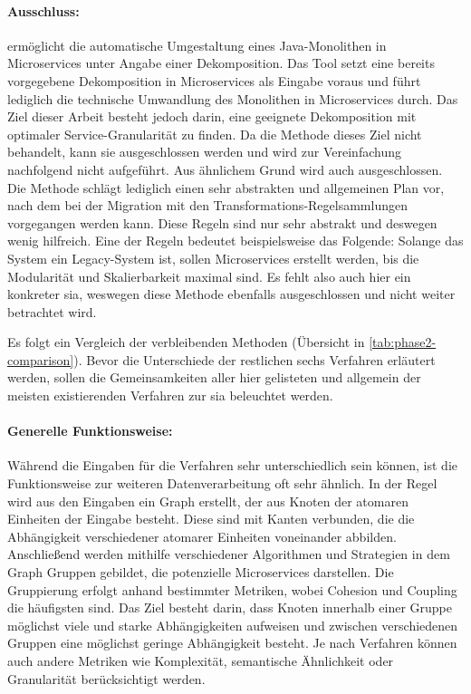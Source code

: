 \paragraph{Ausschluss:}  ermöglicht die automatische Umgestaltung eines Java-Mo\-no\-li\-then in Microservices unter Angabe einer Dekomposition.
Das Tool setzt eine bereits vorgegebene Dekomposition in Microservices als Eingabe voraus und führt lediglich die technische Umwandlung des Monolithen in Microservices durch.
Das Ziel dieser Arbeit besteht jedoch darin, eine geeignete Dekomposition mit optimaler Service-Granularität zu finden.
Da die Methode dieses Ziel nicht behandelt, kann sie ausgeschlossen werden und wird zur Vereinfachung nachfolgend nicht aufgeführt.
Aus ähnlichem Grund wird auch  ausgeschlossen.
Die Methode schlägt lediglich einen sehr abstrakten und allgemeinen Plan vor, nach dem bei der Migration mit den Transformations-Regelsammlungen vorgegangen werden kann.
Diese Regeln sind nur sehr abstrakt und deswegen wenig hilfreich.
Eine der Regeln bedeutet beispielsweise das Folgende:
Solange das System ein Legacy-System ist, sollen Microservices erstellt werden, bis die Modularität und Skalierbarkeit maximal sind.
Es fehlt also auch hier ein konkreter \gls{sia}, weswegen diese Methode ebenfalls ausgeschlossen und nicht weiter betrachtet wird.


Es folgt ein Vergleich der verbleibenden Methoden (Übersicht in \cref{tab:phase2-comparison}).
Bevor die Unterschiede der restlichen sechs Verfahren erläutert werden, sollen die Gemeinsamkeiten aller hier gelisteten und allgemein der meisten existierenden Verfahren zur \gls{sia} beleuchtet werden.



\paragraph{Generelle Funktionsweise:}
Während die Eingaben für die Verfahren sehr unterschiedlich sein können, ist die Funktionsweise zur weiteren Datenverarbeitung oft sehr ähnlich.
In der Regel wird aus den Eingaben ein Graph erstellt, der aus Knoten der atomaren Einheiten der Eingabe besteht.
Diese sind mit Kanten verbunden, die die Abhängigkeit verschiedener atomarer Einheiten voneinander abbilden.
Anschließend werden mithilfe verschiedener Algorithmen und Strategien in dem Graph Gruppen gebildet, die potenzielle Microservices darstellen.
Die Gruppierung erfolgt anhand bestimmter Metriken, wobei Cohesion und Coupling die häufigsten sind.
Das Ziel besteht darin, dass Knoten innerhalb einer Gruppe möglichst viele und starke Abhängigkeiten aufweisen und zwischen verschiedenen Gruppen eine möglichst geringe Abhängigkeit besteht.
Je nach Verfahren können auch andere Metriken wie Komplexität, semantische Ähnlichkeit oder Granularität berücksichtigt werden.

